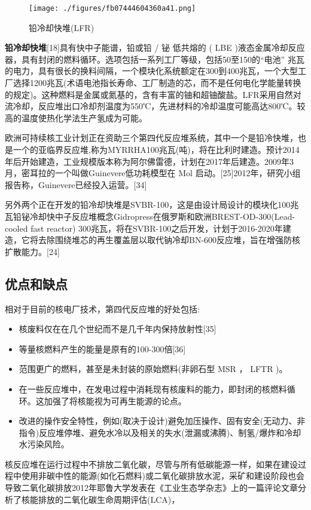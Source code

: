 \begin{figure}[ht]
\centering
\texttt{[image: ./figures/fb07444604360a41.png]}
\caption{铅冷却快堆(LFR)} \label{fig_FYD_8}
\end{figure}
\textbf{铅冷却快堆}[18]具有快中子能谱，铅或铅 / 铋 低共熔的 ( LBE )液态金属冷却反应器，具有封闭的燃料循环。选项包括一系列工厂等级，包括50至150的“电池” 兆瓦的电力，具有很长的换料间隔，一个模块化系统额定在300到400兆瓦，一个大型工厂选择1200兆瓦(术语电池指长寿命、工厂制造的芯，而不是任何电化学能量转换的规定)。这种燃料是金属或氮基的，含有丰富的铀和超铀酸盐。LFR采用自然对流冷却，反应堆出口冷却剂温度为550℃，先进材料的冷却温度可能高达800℃。较高的温度使热化学法生产氢成为可能。

欧洲可持续核工业计划正在资助三个第四代反应堆系统，其中一个是铅冷快堆，也是一个的亚临界反应堆,称为MYRRHA100兆瓦(吨)，将在比利时建造。预计2014年后开始建造，工业规模版本称为阿尔佛雷德，计划在2017年后建造。2009年3月，密耳拉的一个叫做Guinevere低功耗模型在 Mol 启动。[25]2012年，研究小组报告称，Guinevere已经投入运营。[34]

另外两个正在开发的铅冷却快堆是SVBR-100，这是由设计局设计的模块化100兆瓦铅铋冷却快中子反应堆概念Gidropress在俄罗斯和欧洲BREST-OD-300(Lead-cooled fast reactor) 300兆瓦，将在SVBR-100之后开发，计划于2016-2020年建造，它将去除围绕堆芯的再生覆盖层以取代钠冷却BN-600反应堆，旨在增强防核扩散能力。[24]

\subsection{优点和缺点}
相对于目前的核电厂技术，第四代反应堆的好处包括:
\begin{itemize}
\item 核废料仅在在几个世纪而不是几千年内保持放射性[35]
\item 等量核燃料产生的能量是原有的100-300倍[36]
\item 范围更广的燃料，甚至是未封装的原始燃料(非卵石型 MSR ， LFTR )。
\item 在一些反应堆中，在发电过程中消耗现有核废料的能力，即封闭的核燃料循环。这加强了将核能视为可再生能源的论点。
\item 改进的操作安全特性，例如(取决于设计)避免加压操作、固有安全(无动力、非指令)反应堆停堆、避免水冷以及相关的失水(泄漏或沸腾)、制氢/爆炸和冷却水污染风险。
\end{itemize}
核反应堆在运行过程中不排放二氧化碳，尽管与所有低碳能源一样，如果在建设过程中使用非碳中性的能源(如化石燃料)或二氧化碳排放水泥，采矿和建设阶段也会导致二氧化碳排放2012年耶鲁大学发表在《工业生态学杂志》上的一篇评论文章分析了核能排放的二氧化碳生命周期评估(LCA)，

